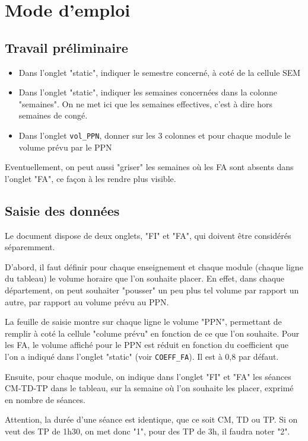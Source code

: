 \documentclass[12pt,a4paper]{article}
\begin{document}
\section{Mode d'emploi}

\subsection{Travail préliminaire}
\begin{itemize}
\item Dans l'onglet "static", indiquer le semestre concerné, à coté de la cellule SEM
\item Dans l'onglet "static", indiquer les semaines concernées dans la colonne "semaines".
On ne met ici que les semaines effectives, c'est à dire hors semaines de congé.

\item Dans l'onglet {\tt vol\_PPN}, donner sur les 3 colonnes et pour chaque module le volume prévu par le PPN
\end{itemize}

Eventuellement, on peut aussi "griser" les semaines où les FA sont absents dans l'onglet "FA", ce façon à les rendre plus visible.

\subsection{Saisie des données}

Le document dispose de deux onglets, "FI" et "FA", qui doivent être considérés séparemment.

D'abord, il faut définir pour chaque enseignement et chaque module (chaque ligne du tableau) le volume horaire que l'on souhaite placer.
En effet, dans chaque département, on peut souhaiter "pousser" un peu plus tel volume par rapport un autre, par rapport au volume prévu au PPN.

La feuille de saisie montre sur chaque ligne le volume "PPN", permettant de remplir à coté la cellule "colume prévu" en fonction de ce que l'on souhaite.
Pour les FA, le volume affiché pour le PPN est réduit en fonction du coefficient que l'on a indiqué dans l'onglet "static"
(voir {\tt COEFF\_FA}).
Il est à 0,8 par défaut.

Ensuite, pour chaque module, on indique dans l'onglet "FI" et "FA" les séances CM-TD-TP dans le tableau, sur la semaine où l'on souhaite les placer, exprimé en nombre de séances.

Attention, la durée d'une séance est identique, que ce soit CM, TD ou TP.
Si on veut des TP de 1h30, on met donc "1", pour des TP de 3h, il faudra noter "2".
\end{document}
